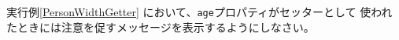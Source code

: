 \begin{Prob}\upshape
 実行例\else\ref{PersonWidthGetter}\fi
 において、\texttt{age}プロパティがセッターとして
 使われたときには注意を促すメッセージを表示するようにしなさい。
\end{Prob}

